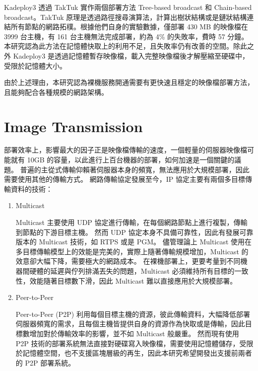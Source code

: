 Kadeploy3 透過 TakTuk 實作兩個部署方法 Tree-based broadcast 和 Chain-based broadcast。TakTuk 原理是透過路徑搜尋演算法，計算出樹狀結構或是鏈狀結構連結所有節點的網路拓樸。根據他們自身的實驗數據\cite{sarzyniec2012scalability}，僅部署 430 MB 的映像檔在 3999 台主機，有 161 台主機無法完成部署，約為 4\% 的失敗率，費時 57 分鐘。本研究認為此方法在記憶體快取上的利用不足，且失敗率仍有改善的空間。除此之外 Kadeploy3 是透過記憶體暫存映像檔，載入完整映像檔後才解壓縮至硬碟中，受限於記憶體大小。


由於上述理由，本研究認為裸機服務開通需要有更快速且穩定的映像檔部署方法，且能夠配合各種規模的網路架構。

\section{Image Transmission}
部署效率上，影響最大的因子正是映像檔傳輸的速度，一個輕量的伺服器映像檔可能就有 10GB 的容量，以此進行上百台機器的部署，如何加速是一個關鍵的議題。
普遍的主從式傳輸仰賴著伺服器本身的頻寬，無法應用於大規模部署，因此需要使用其他的傳輸方式。
網路傳輸協定發展至今，IP 協定主要有兩個多目標傳輸資料的技術：

\begin{enumerate}
\item Multicast

Multicast 主要使用 UDP 協定進行傳輸，在每個網路節點上進行複製，傳輸到節點的下游目標主機。
然而 UDP 協定本身不具備可靠性，因此有發展可靠版本的 Multicast 技術，如 RTPS 或是 PGM。
儘管理論上 Multicast 使用在多目標傳輸模型上的效能是完美的，實際上隨著傳輸規模增加，Multicast 的效意卻大幅下降，需要極大的網路成本。
在裸機部署上，更要考量到不同機器間硬體的延遲與佇列排滿丟失的問題，Multicast 必須維持所有目標的一致性，效能隨著目標數下滑，因此 Multicast 難以直接應用於大規模部署。
\item Peer-to-Peer

Peer-to-Peer (P2P) 利用每個目標主機的資源，彼此傳輸資料，大幅降低部署伺服器頻寬的需求，且每個主機皆提供自身的資源作為快取或是傳輸，因此目標數增加對於傳輸效率的影響，並不如 Multicast 般嚴重。
然而現有使用 P2P 技術的部署系統無法直接對硬碟寫入映像檔，需要使用記憶體儲存，受限於記憶體空間，也不支援區塊層級的再生，因此本研究希望開發出支援前兩者的 P2P 部署系統。
\end{enumerate}



